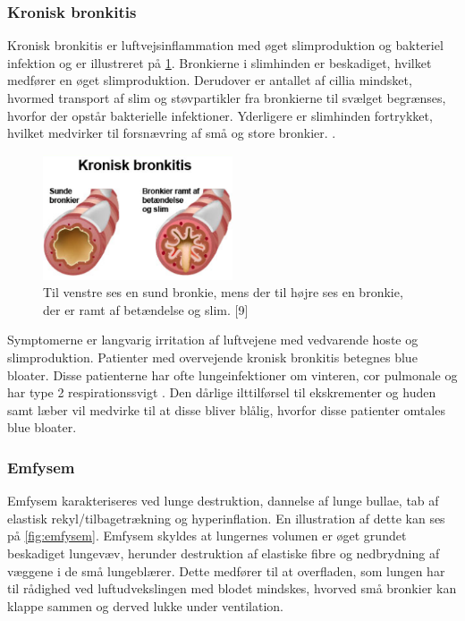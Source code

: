 \subsubsection{Kronisk bronkitis} 
Kronisk bronkitis er luftvejsinflammation med øget slimproduktion og bakteriel infektion og er illustreret på \ref{fig:kroniskbronkitis}. Bronkierne i slimhinden er beskadiget, hvilket medfører en øget slimproduktion. Derudover er antallet af cillia mindsket, hvormed transport af slim og støvpartikler fra bronkierne til svælget begrænses, hvorfor der opstår bakterielle infektioner. Yderligere er slimhinden fortrykket, hvilket medvirker til forsnævring af små og store bronkier. \cite{Frausing2011, Britannica2016}. 

\begin{figure} [H]
\centering
\includegraphics[width=0.5\textwidth]{figures/kroniskbronkitis}
\caption{Til venstre ses en sund bronkie, mens der til højre ses en bronkie, der er ramt af betændelse og slim.  [9]}
\label{fig:kroniskbronkitis}
\end{figure} 

\noindent
Symptomerne er langvarig irritation af luftvejene med vedvarende hoste og slimproduktion. Patienter med overvejende kronisk bronkitis betegnes blue bloater. Disse patienterne har ofte lungeinfektioner om vinteren, cor pulmonale  og har type 2 respirationssvigt . Den dårlige ilttilførsel til ekskrementer og huden samt læber vil medvirke til at disse bliver blålig, hvorfor disse patienter omtales blue bloater. \cite{Healthguidances2016}

\subsubsection{Emfysem}
Emfysem karakteriseres ved lunge destruktion, dannelse af lunge bullae, tab af elastisk rekyl/tilbagetrækning og hyperinflation. En illustration af dette kan ses på \ref{fig:emfysem}. Emfysem skyldes at lungernes volumen er øget grundet beskadiget lungevæv, herunder destruktion af elastiske fibre og nedbrydning af væggene i de små lungeblærer. Dette medfører til at overfladen, som lungen har til rådighed ved luftudvekslingen med blodet mindskes, hvorved små bronkier kan klappe sammen og derved lukke under ventilation.\cite{Frausing2011a, Flaschen-Hansen2008}

